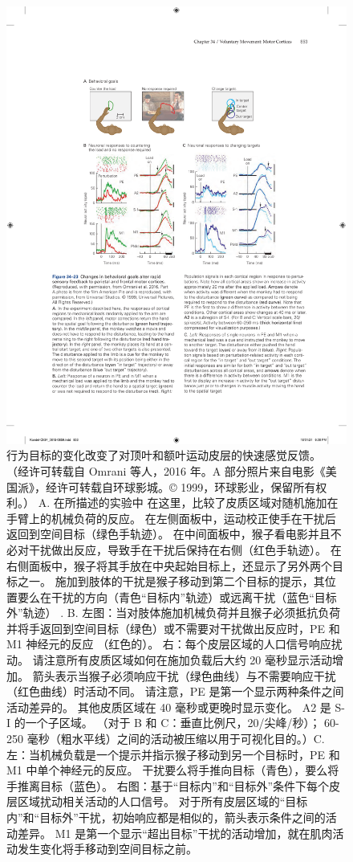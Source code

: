 \begin{figure}[htbp]
	\centering
	\includegraphics[width=0.75\linewidth]{chap34/fig_34_23}
	\caption{行为目标的变化改变了对顶叶和额叶运动皮层的快速感觉反馈。 （经许可转载自 Omrani 等人，2016 年。A 部分照片来自电影《美国派》，经许可转载自环球影城。© 1999，环球影业，保留所有权利。） A. 在所描述的实验中 在这里，比较了皮质区域对随机施加在手臂上的机械负荷的反应。 在左侧面板中，运动校正使手在干扰后返回到空间目标（绿色手轨迹）。 在中间面板中，猴子看电影并且不必对干扰做出反应，导致手在干扰后保持在右侧（红色手轨迹）。 在右侧面板中，猴子将其手放在中央起始目标上，还显示了另外两个目标之一。 施加到肢体的干扰是猴子移动到第二个目标的提示，其位置要么在干扰的方向（青色“目标内”轨迹）或远离干扰（蓝色“目标外”轨迹） . B. 左图：当对肢体施加机械负荷并且猴子必须抵抗负荷并将手返回到空间目标（绿色）或不需要对干扰做出反应时，PE 和 M1 神经元的反应 （红色的）。 右：每个皮层区域的人口信号响应扰动。 请注意所有皮质区域如何在施加负载后大约 20 毫秒显示活动增加。 箭头表示当猴子必须响应干扰（绿色曲线）与不需要响应干扰（红色曲线）时活动不同。 请注意，PE 是第一个显示两种条件之间活动差异的。 其他皮质区域在 40 毫秒或更晚时显示变化。 A2 是 S-I 的一个子区域。 （对于 B 和 C：垂直比例尺，20/尖峰/秒）； 60-250 毫秒（粗水平线）之间的活动被压缩以用于可视化目的。）C. 左：当机械负载是一个提示并指示猴子移动到另一个目标时，PE 和 M1 中单个神经元的反应。 干扰要么将手推向目标（青色），要么将手推离目标（蓝色）。 右图：基于“目标内”和“目标外”条件下每个皮层区域扰动相关活动的人口信号。 对于所有皮层区域的“目标内”和“目标外”干扰，初始响应都是相似的，箭头表示条件之间的活动差异。 M1 是第一个显示“超出目标”干扰的活动增加，就在肌肉活动发生变化将手移动到空间目标之前。}
	\label{fig:34_23}
\end{figure}

